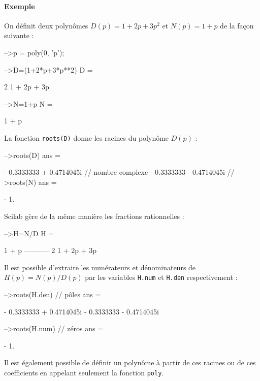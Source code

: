 \paragraph{Exemple}
On définit deux polynômes $D(p)=1+2p+3p^2$ et $N(p)=1+p$ de la façon 
suivante :
\begin{Scilabcode}
-->p = poly(0, 'p');

-->D=(1+2*p+3*p**2)
 D  =
 
               2  
    1 + 2p + 3p 

-->N=1+p
 N  =
 
    1 + p
\end{Scilabcode}
La fonction \verb?roots(D)? donne les racines du polynôme $D(p)$ :
\begin{Scilabcode}
-->roots(D)
 ans  =
 
  - 0.3333333 + 0.4714045i     // nombre complexe 
  - 0.3333333 - 0.4714045i     // 
-->roots(N)
 ans  =
  
   - 1.
\end{Scilabcode}
Scilab gère de la même manière les fractions rationnelles :
\begin{Scilabcode}
-->H=N/D
 H  =
 
       1 + p      
    -----------   
               2  
    1 + 2p + 3p 
\end{Scilabcode}
Il est possible d'extraire les numérateurs et dénominateurs de 
$H(p)=N(p)/D(p)$ par les variables \verb?H.num? et \verb?H.den? 
respectivement :
\begin{Scilabcode}
-->roots(H.den)               // pôles
 ans  =
 
  - 0.3333333 + 0.4714045i  
  - 0.3333333 - 0.4714045i

-->roots(H.num)               // zéros
 ans  =
 
  - 1.
\end{Scilabcode}
Il est également possible de définir un polynôme à partir de ces racines 
ou de ces coefficients en appelant seulement la fonction \verb?poly?.
